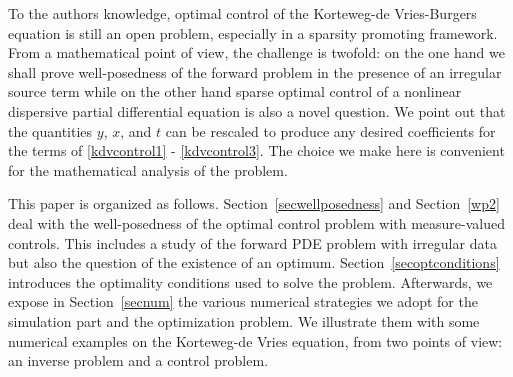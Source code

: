 To the authors knowledge, optimal control of the Korteweg-de Vries-Burgers equation is still an open problem, especially in a sparsity promoting framework. From a mathematical point of view, the challenge is twofold: on the one hand we shall prove well-posedness of the forward problem in the presence of an irregular source term while on the other hand sparse optimal control of a nonlinear dispersive partial differential equation is also a novel question. We point out that the quantities $y$, $x$, and $t$ can be rescaled to produce any desired coefficients for the terms of \eqref{kdvcontrol1} - \eqref{kdvcontrol3}. The choice we make here is convenient for the mathematical analysis of the problem.

This paper is organized as follows. Section~\ref{secwellposedness} and Section~\ref{wp2} deal with the well-posedness of the optimal control problem with measure-valued controls. This includes a study of the forward PDE problem with irregular data but also the question of the existence of an optimum. Section~\ref{secoptconditions} introduces the optimality conditions used to solve the problem. Afterwards, we expose in Section~\ref{secnum} the various numerical strategies we adopt for the simulation part and the optimization problem. We illustrate them with some numerical examples on the Korteweg-de Vries equation, from two points of view: an inverse problem and a control problem.

